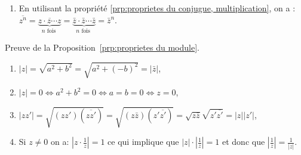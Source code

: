 \begin{corrige}
\begin{dem}
\begin{enumerate}
                  \begin{align*}
                        \frac{1}{z}
                              & =  {\frac{1}{a + i b}}                                          
                                =  {\frac{a - i b}{(a+ib)(a-ib)}}                               
                                =  {\frac{a}{a^2 + b^2} - i \frac{b}{a^2 + b^2}}                        \\
                        \intertext{ on a  }
                        \overline{\frac{1}{z}}
                              & = \frac{a}{a^2 + b^2} + i \frac{b}{a^2 + b^2}                           
                                = \frac{a + i b}{a^2 + b^2}                                             
                                = \frac{a+ib}{(a-ib)(a+ib)}                                             \\
                              & = \frac{1}{a-ib}                                                        
                                = \frac{1}{\bar{z}}                                                     \;.
                  \end{align*}
            \item En utilisant la propri\'et\'e \ref{prp:proprietes du conjugue, multiplication}, on a :
                  $\overline{z^n} = \overline{ \underbrace{z \cdot z \cdots z}_{n \text{ fois }} }
                        = \underbrace{ \bar{z} \cdot \bar{z} \cdots \bar{z} }_{n \text{ fois }} 
                        = {\bar{z}}^n$.
      \end{enumerate}
\end{dem}
\begin{dem}
	\label{dem:proprietes du module}
	Preuve de la Proposition~\ref{prp:proprietes du module}. 
	\begin{enumerate}
	      \item $|z| = \sqrt{a^2 + b^2} = \sqrt{a^2 + (-b)^2} = |\bar{z}|$,
	      \item $|z| = 0 \iff a^2 + b^2 = 0 \iff a = b = 0 \iff z = 0$,
	      \item $|z z'| = \sqrt{(zz') (\overline{zz'})} = \sqrt{(z \bar{z}) (z' \overline{z'})} 
	            = \sqrt{z \bar{z}} \sqrt{z' \overline{z'}} = |z| |z'| $,
	      \item Si $z \neq 0$ on a: $|z \cdot \frac{1}{z}| = 1$ ce qui implique que 
	            $|z| \cdot |\frac{1}{z}| = 1$ et donc que $|\frac{1}{z}| = \frac{1}{|z|}$.

\end{enumerate}
\end{dem}
\end{corrige}
